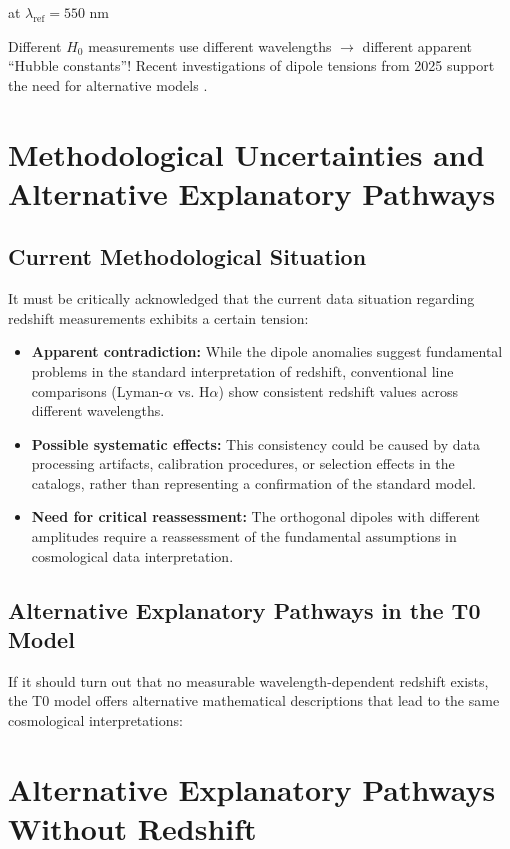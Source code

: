 \documentclass{article}
\begin{document}
	at $\lambda_{\text{ref}} = 550$ nm
	
	Different $H_0$ measurements use different wavelengths $\rightarrow$ different apparent ``Hubble constants''! Recent investigations of dipole tensions from 2025 support the need for alternative models \cite{landstry2025, bengaly2025}.
	
	\section{Methodological Uncertainties and Alternative Explanatory Pathways}
	
	\subsection{Current Methodological Situation}
	
	It must be critically acknowledged that the current data situation regarding redshift measurements exhibits a certain tension:
	
	\begin{itemize}
		\item \textbf{Apparent contradiction:} While the dipole anomalies suggest fundamental problems in the standard interpretation of redshift, conventional line comparisons (Lyman-$\alpha$ vs. H$\alpha$) show consistent redshift values across different wavelengths.
		
		\item \textbf{Possible systematic effects:} This consistency could be caused by data processing artifacts, calibration procedures, or selection effects in the catalogs, rather than representing a confirmation of the standard model.
		
		\item \textbf{Need for critical reassessment:} The orthogonal dipoles with different amplitudes require a reassessment of the fundamental assumptions in cosmological data interpretation.
	\end{itemize}
	
	\subsection{Alternative Explanatory Pathways in the T0 Model}
	
	If it should turn out that no measurable wavelength-dependent redshift exists, the T0 model offers alternative mathematical descriptions that lead to the same cosmological interpretations:
	
\section{Alternative Explanatory Pathways Without Redshift}
\end{document}
